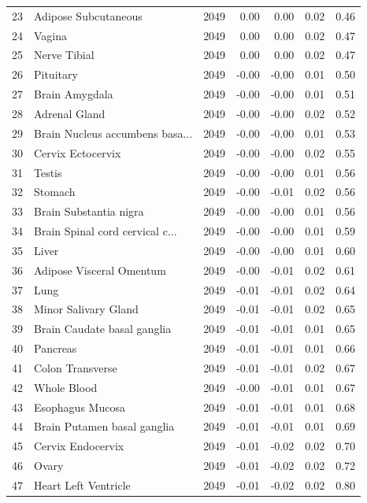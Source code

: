\documentclass{article}
\begin{document}
\begin{table}[h!]
\begin{tabular}{rlrrrrr}
  23 & Adipose Subcutaneous & 2049 & 0.00 & 0.00 & 0.02 & 0.46 \\ 
  24 & Vagina  & 2049 & 0.00 & 0.00 & 0.02 & 0.47 \\ 
  25 & Nerve Tibial  & 2049 & 0.00 & 0.00 & 0.02 & 0.47 \\ 
  26 & Pituitary  & 2049 & -0.00 & -0.00 & 0.01 & 0.50 \\ 
  27 & Brain Amygdala & 2049 & -0.00 & -0.00 & 0.01 & 0.51 \\ 
  28 & Adrenal Gland & 2049 & -0.00 & -0.00 & 0.02 & 0.52 \\ 
  29 & Brain Nucleus accumbens basa... & 2049 & -0.00 & -0.00 & 0.01 & 0.53 \\ 
  30 & Cervix Ectocervix & 2049 & -0.00 & -0.00 & 0.02 & 0.55 \\ 
  31 & Testis  & 2049 & -0.00 & -0.00 & 0.01 & 0.56 \\ 
  32 & Stomach  & 2049 & -0.00 & -0.01 & 0.02 & 0.56 \\ 
  33 & Brain Substantia nigra & 2049 & -0.00 & -0.00 & 0.01 & 0.56 \\ 
  34 & Brain Spinal cord cervical c... & 2049 & -0.00 & -0.00 & 0.01 & 0.59 \\ 
  35 & Liver & 2049 & -0.00 & -0.00 & 0.01 & 0.60 \\ 
  36 & Adipose Visceral Omentum & 2049 & -0.00 & -0.01 & 0.02 & 0.61 \\ 
  37 & Lung & 2049 & -0.01 & -0.01 & 0.02 & 0.64 \\ 
  38 & Minor Salivary Gland & 2049 & -0.01 & -0.01 & 0.02 & 0.65 \\ 
  39 & Brain Caudate basal ganglia & 2049 & -0.01 & -0.01 & 0.01 & 0.65 \\ 
  40 & Pancreas & 2049 & -0.01 & -0.01 & 0.01 & 0.66 \\ 
  41 & Colon Transverse & 2049 & -0.01 & -0.01 & 0.02 & 0.67 \\ 
  42 & Whole Blood & 2049 & -0.00 & -0.01 & 0.01 & 0.67 \\ 
  43 & Esophagus Mucosa & 2049 & -0.01 & -0.01 & 0.01 & 0.68 \\ 
  44 & Brain Putamen basal ganglia & 2049 & -0.01 & -0.01 & 0.01 & 0.69 \\ 
  45 & Cervix Endocervix & 2049 & -0.01 & -0.02 & 0.02 & 0.70 \\ 
  46 & Ovary & 2049 & -0.01 & -0.02 & 0.02 & 0.72 \\ 
  47 & Heart Left Ventricle & 2049 & -0.01 & -0.02 & 0.02 & 0.80 \\ 

\end{tabular}
\end{table}
\end{document}

